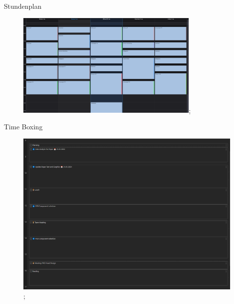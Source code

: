 \documentclass[aspectratio=169,shownotes]{beamer}
\begin{document}
\begin{frame}{Stundenplan}
    \begin{figure}
       \includegraphics[width=0.8\textwidth]{graphics/Kalender/Kalender5.PNG};
    \end{figure}
\end{frame}

\begin{frame}{Time Boxing}    
    \begin{figure}
       \includegraphics[height=0.8\textheight,trim={0 0 10cm 0},clip]{graphics/MyDailyPlan.png};
    \end{figure}
\end{frame}
\end{document}
